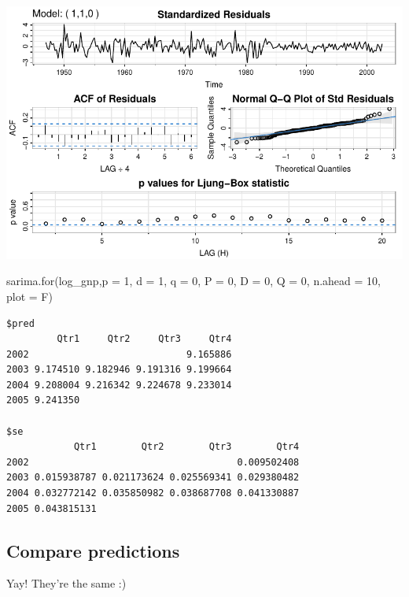 \documentclass[
  letterpaper,
  DIV=11,
  numbers=noendperiod]{scrartcl}
\newenvironment{Shaded}{\begin{snugshade}}{\end{snugshade}}
\newcommand{\AttributeTok}[1]{\textcolor[rgb]{0.40,0.45,0.13}{#1}}
\newcommand{\DecValTok}[1]{\textcolor[rgb]{0.68,0.00,0.00}{#1}}
\newcommand{\FunctionTok}[1]{\textcolor[rgb]{0.28,0.35,0.67}{#1}}
\newcommand{\NormalTok}[1]{\textcolor[rgb]{0.00,0.23,0.31}{#1}}
\begin{document}
\includegraphics{Lecture12_files/figure-pdf/unnamed-chunk-6-1.pdf}

\begin{Shaded}
\begin{Highlighting}[]
\FunctionTok{sarima.for}\NormalTok{(log\_gnp,}\AttributeTok{p =} \DecValTok{1}\NormalTok{, }\AttributeTok{d =} \DecValTok{1}\NormalTok{, }\AttributeTok{q =} \DecValTok{0}\NormalTok{, }\AttributeTok{P =} \DecValTok{0}\NormalTok{, }\AttributeTok{D =} \DecValTok{0}\NormalTok{, }\AttributeTok{Q =} \DecValTok{0}\NormalTok{, }\AttributeTok{n.ahead =} \DecValTok{10}\NormalTok{, }\AttributeTok{plot =}\NormalTok{ F)}
\end{Highlighting}
\end{Shaded}

\begin{verbatim}
$pred
         Qtr1     Qtr2     Qtr3     Qtr4
2002                            9.165886
2003 9.174510 9.182946 9.191316 9.199664
2004 9.208004 9.216342 9.224678 9.233014
2005 9.241350                           

$se
            Qtr1        Qtr2        Qtr3        Qtr4
2002                                     0.009502408
2003 0.015938787 0.021173624 0.025569341 0.029380482
2004 0.032772142 0.035850982 0.038687708 0.041330887
2005 0.043815131                                    
\end{verbatim}

\subsection{Compare predictions}\label{compare-predictions}

Yay! They're the same :)
\end{document}
